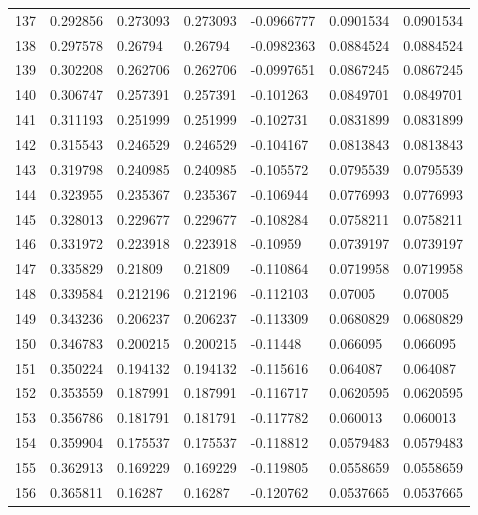\begin{longtable}{l|lll|lll}
 137 &  0.292856    & 0.273093    & 0.273093    & -0.0966777   & 0.0901534   & 0.0901534   \\
 138 &  0.297578    & 0.26794     & 0.26794     & -0.0982363   & 0.0884524   & 0.0884524   \\
 139 &  0.302208    & 0.262706    & 0.262706    & -0.0997651   & 0.0867245   & 0.0867245   \\
 140 &  0.306747    & 0.257391    & 0.257391    & -0.101263    & 0.0849701   & 0.0849701   \\
 141 &  0.311193    & 0.251999    & 0.251999    & -0.102731    & 0.0831899   & 0.0831899   \\
 142 &  0.315543    & 0.246529    & 0.246529    & -0.104167    & 0.0813843   & 0.0813843   \\
 143 &  0.319798    & 0.240985    & 0.240985    & -0.105572    & 0.0795539   & 0.0795539   \\
 144 &  0.323955    & 0.235367    & 0.235367    & -0.106944    & 0.0776993   & 0.0776993   \\
 145 &  0.328013    & 0.229677    & 0.229677    & -0.108284    & 0.0758211   & 0.0758211   \\
 146 &  0.331972    & 0.223918    & 0.223918    & -0.10959     & 0.0739197   & 0.0739197   \\
 147 &  0.335829    & 0.21809     & 0.21809     & -0.110864    & 0.0719958   & 0.0719958   \\
 148 &  0.339584    & 0.212196    & 0.212196    & -0.112103    & 0.07005     & 0.07005     \\
 149 &  0.343236    & 0.206237    & 0.206237    & -0.113309    & 0.0680829   & 0.0680829   \\
 150 &  0.346783    & 0.200215    & 0.200215    & -0.11448     & 0.066095    & 0.066095    \\
 151 &  0.350224    & 0.194132    & 0.194132    & -0.115616    & 0.064087    & 0.064087    \\
 152 &  0.353559    & 0.187991    & 0.187991    & -0.116717    & 0.0620595   & 0.0620595   \\
 153 &  0.356786    & 0.181791    & 0.181791    & -0.117782    & 0.060013    & 0.060013    \\
 154 &  0.359904    & 0.175537    & 0.175537    & -0.118812    & 0.0579483   & 0.0579483   \\
 155 &  0.362913    & 0.169229    & 0.169229    & -0.119805    & 0.0558659   & 0.0558659   \\
 156 &  0.365811    & 0.16287     & 0.16287     & -0.120762    & 0.0537665   & 0.0537665   \\

\end{longtable}
